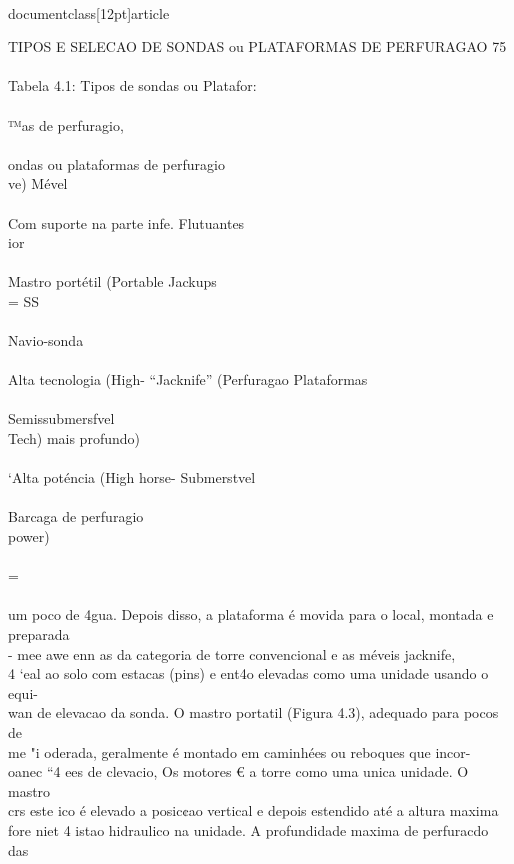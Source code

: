 \\documentclass[12pt]{article}
\begin{document}
TIPOS E SELECAO DE SONDAS ou PLATAFORMAS DE PERFURAGAO 75\\
\\
Tabela 4.1: Tipos de sondas ou Platafor:\\
\\
™as de perfuragio,\\
\\
ondas ou plataformas de perfuragio\\
ve) Mével\\
\\
Com suporte na parte infe. Flutuantes\\
ior\\
\\
Mastro portétil (Portable Jackups\\
= SS\\
\\
Navio-sonda\\
\\
Alta tecnologia (High- “Jacknife” (Perfuragao Plataformas\\
\\
Semissubmersfvel\\
Tech) mais profundo)\\
\\
‘Alta poténcia (High horse- Submerstvel\\
\\
Barcaga de perfuragio\\
power)\\
\\
=\\
\\
um poco de 4gua. Depois disso, a plataforma é movida para o local, montada e preparada\\
- mee awe enn as da categoria de torre convencional e as méveis jacknife,\\
4 ‘eal ao solo com estacas (pins) e ent4o elevadas como uma unidade usando o equi-\\
wan de elevacao da sonda. O mastro portatil (Figura 4.3), adequado para pocos de\\
me "i oderada, geralmente é montado em caminhées ou reboques que incor-\\
oanec “4 ees de clevacio, Os motores € a torre como uma unica unidade. O mastro\\
crs este ico é elevado a posic¢ao vertical e depois estendido até a altura maxima\\
fore niet 4 istao hidraulico na unidade. A profundidade maxima de perfuracdo das\\
\end{document}
